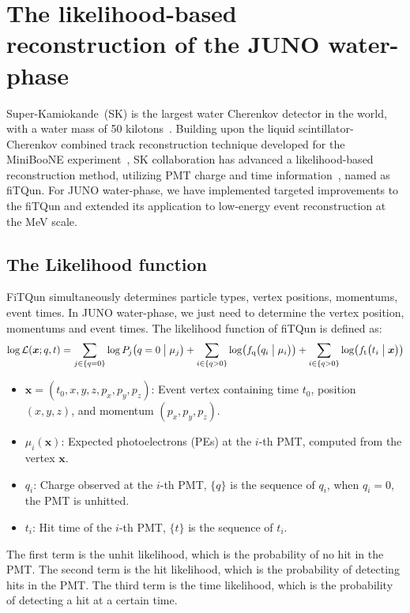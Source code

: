 
\section{The likelihood-based reconstruction of the JUNO water-phase}
Super-Kamiokande~(SK) is the largest water Cherenkov detector in the world, with a water mass of 50 kilotons~\cite{SK}.
Building upon the liquid scintillator-Cherenkov combined track reconstruction technique developed for the MiniBooNE experiment~\cite{minibone}, SK collaboration has advanced a likelihood-based reconstruction method, utilizing PMT charge and time information~\cite{SKfiTQun}, named as fiTQun.  For JUNO water-phase, we have implemented targeted improvements to the fiTQun and extended its application to low-energy event reconstruction at the \si{MeV} scale.

\subsection{The Likelihood function}
FiTQun simultaneously determines particle types, vertex positions, momentums, event times.
In JUNO water-phase, we just need to determine the vertex position, momentums and event times.
The likelihood function of fiTQun is defined as:
\begin{equation}
	\log \mathcal{L}(\boldsymbol{x};{q},{t}) = \sum_{j \in \{q=0\}} \log P_j \bigl( q=0\bigm| \mu_j \bigr) + \sum_{i \in \{q>0\}} \log \bigl( f_{\mathrm{q}}\bigl( q_i \bigm| \mu_i \bigr) \bigr) + \sum_{i \in \{q>0\}} \log \bigl( f_{\mathrm{t}} \bigl( t_i \bigm| \boldsymbol{x} \bigr) \bigr)
\end{equation}
\begin{itemize}
	\item $\boldsymbol{x} = (t_0, x, y, z, p_x, p_y, p_z)$: Event vertex containing time $t_0$, position $(x,y,z)$, and momentum $(p_x,p_y,p_z)$.
	\item $\mu_i(\boldsymbol{x})$: Expected photoelectrons (PEs) at the $i$-th PMT, computed from the vertex $\boldsymbol{x}$.
	\item $q_i$: Charge observed at the $i$-th PMT, $\{q\}$ is the sequence of $q_i$, when $q_i=0$, the PMT is unhitted.
	\item $t_i$: Hit time of the $i$-th PMT, $\{t\}$ is the sequence of $t_i$.
\end{itemize}

The first term is the unhit likelihood, which is the probability of no hit in the PMT. The second term is the hit likelihood, which is the probability of detecting hits in the PMT. The third term is the time likelihood, which is the probability of detecting a hit at a certain time.


